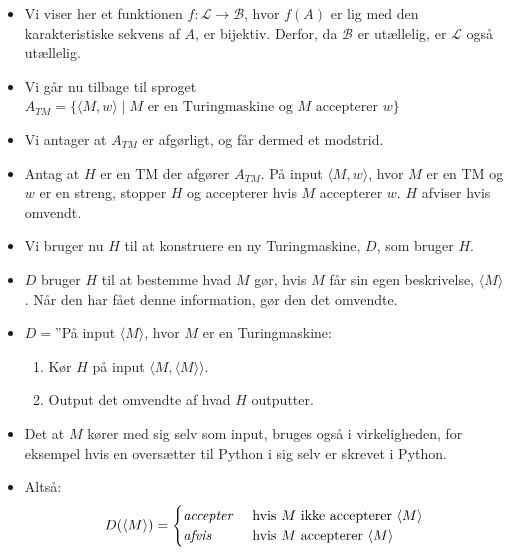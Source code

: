 \begin{frame}[allowframebreaks]
\begin{itemize}
		\item Vi viser her et funktionen $f : \mathcal{L} \rightarrow \mathcal{B}$, hvor $f(A)$ er lig med den karakteristiske sekvens af $A$, er bijektiv. Derfor, da $\mathcal{B}$ er utællelig, er $\mathcal{L}$ også utællelig.
		\item Vi går nu tilbage til  sproget $A_{TM} = \{\langle M, w \rangle \mid M \text{ er en Turingmaskine og } M \text{ accepterer }w\}$
		\item Vi antager at $A_{TM}$ er afgørligt, og får dermed et modstrid.
		\item Antag at $H$ er en TM der afgører $A_{TM}$. På input $\langle M, w \rangle $, hvor $M$ er en TM og $w$ er en streng, stopper $H$ og accepterer hvis $M$ accepterer $w$. $H$ afviser hvis omvendt.
		\item Vi bruger nu $H$ til at konstruere en ny Turingmaskine, $D$, som bruger $H$.
		\item $D$ bruger $H$ til at bestemme hvad $M$ gør, hvis $M$ får sin egen beskrivelse, $\langle M \rangle$. Når den har fået denne information, gør den det omvendte.
		\item $D = $''På input \(\langle M \rangle \), hvor $M$ er en Turingmaskine:
		      \begin{enumerate}
			      \item Kør $H$ på input \(\langle M, \langle M \rangle \rangle\).
			      \item Output det omvendte af hvad $H$ outputter.
		      \end{enumerate}
		\item Det at $M$ kører med sig selv som input, bruges også i virkeligheden, for eksempel hvis en oversætter til Python i sig selv er skrevet i Python.

		\item Altså:
		      \begin{equation*}
			      D(\langle M \rangle ) = \begin{cases}
				      \text{\textit{accepter}} & \text{ hvis }M \text{ ikke accepterer } \langle M \rangle \\
				      \text{\textit{afvis}}    & \text{ hvis }M \text{ accepterer } \langle M \rangle
			      \end{cases}
		      \end{equation*}


\end{itemize}
\end{frame}
